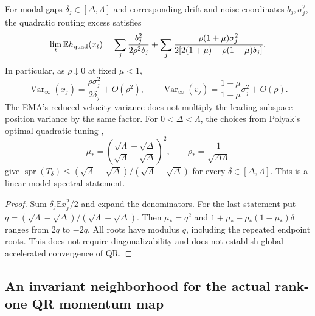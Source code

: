 \begin{corollary}
For modal gaps $\delta_j\in[\Delta,\Lambda]$ and corresponding drift and
noise coordinates $b_j,\sigma_j^2$, the quadratic routing excess satisfies
\begin{equation}
 \lim_t\mathbb E h_{\rm quad}(x_t)
 =\sum_j\frac{b_j^2}{2\rho^2\delta_j}
   +\sum_j\frac{\rho(1+\mu)\sigma_j^2}
           {2[2(1+\mu)-\rho(1-\mu)\delta_j]}.
 \label{eq:modal-energy}
\end{equation}
In particular, as $\rho\downarrow0$ at fixed $\mu<1$,
\begin{equation}
 \operatorname{Var}_\infty(x_j)
       =\frac{\rho\sigma_j^2}{2\delta_j}+O(\rho^2),\qquad
 \operatorname{Var}_\infty(v_j)
       =\frac{1-\mu}{1+\mu}\sigma_j^2+O(\rho).
\end{equation}
The EMA's reduced velocity variance does not multiply the leading
subspace-position variance by the same factor.
For $0<\Delta<\Lambda$, the choices from Polyak's optimal quadratic tuning
\cite{polyak1964speeding},
\begin{equation}
 \mu_*=\left(\frac{\sqrt\Lambda-\sqrt\Delta}
                  {\sqrt\Lambda+\sqrt\Delta}\right)^2,
 \qquad \rho_*=\frac1{\sqrt{\Delta\Lambda}}
\end{equation}
give $\operatorname{spr}(T_\delta)\le
(\sqrt\Lambda-\sqrt\Delta)/(\sqrt\Lambda+\sqrt\Delta)$ for every
$\delta\in[\Delta,\Lambda]$. This is a linear-model spectral statement.
\end{corollary}
\begin{proof}
Sum $\delta_j\mathbb E x_j^2/2$ and expand the denominators.
For the last statement put $q=(\sqrt\Lambda-\sqrt\Delta)/
(\sqrt\Lambda+\sqrt\Delta)$. Then $\mu_*=q^2$ and
$1+\mu_*-\rho_*(1-\mu_*)\delta$ ranges from $2q$ to $-2q$.
All roots have modulus $q$, including the repeated endpoint roots. This
does not require diagonalizability and does not establish global
accelerated convergence of QR.
\end{proof}

\subsection{An invariant neighborhood for the actual rank-one QR momentum map}
\label{app:rankone-nonlinear}


